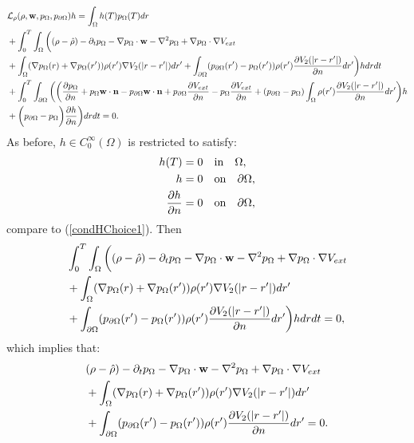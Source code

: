 \begin{align*}
&\mathcal{L}_\rho (\rho,\mathbf{w},p_\Omega,p_{\partial \Omega})h=
\int_\Omega h(T) p_\Omega(T) dr\\
&+ \int_0^T \int_\Omega \bigg( (\rho- \hat{\rho})   - \partial_t  p_\Omega  - \nabla p_\Omega \cdot \mathbf{w}  - \nabla^2 p_\Omega \notag 
+  \nabla p_\Omega\cdot \nabla V_{ext}  \notag \\
&+ \int_\Omega (\nabla  p_\Omega(r)+\nabla  p_\Omega(r')) \rho(r') \nabla V_2(|r-r'|) dr'+ \int_{\partial \Omega} ( p_{\partial \Omega}(r') - p_\Omega(r')) \rho(r')   \frac{\partial V_2(|r-r'|)}{\partial n} dr' \bigg) h dr dt \\
&+  \int_0^T\int_{\partial \Omega}  \bigg(
\bigg(\frac{\partial p_\Omega }{\partial n} + p_\Omega  \mathbf{w} \cdot \mathbf{n} - p_{\partial \Omega}\mathbf{w} \cdot \mathbf{n}  +  p_{\partial \Omega} \dfrac{\partial V_{ext}}{\partial n} - p_\Omega \frac{\partial V_{ext}}{\partial n} + ( p_{\partial \Omega} - p_\Omega)  \int_\Omega \rho(r') \frac{\partial V_2(|r-r'|)}{\partial n} dr'\bigg)h \notag\\
&+ \bigg( p_{\partial \Omega}- p_\Omega \bigg) \frac{\partial h}{\partial n} \bigg) dr dt =0.
\end{align*}
As before, $h \in C_0^\infty(\Omega)$ is restricted to satisfy:
\begin{align*}
h(T)&=0 \quad \text{in} \quad \Omega, \\
h&=0 \quad \text{on} \quad \partial \Omega, \notag \\
\frac{\partial h}{\partial n}&=0 \quad \text{on} \quad \partial \Omega, \notag
\end{align*}
compare to (\ref{condHChoice1}).
Then
\begin{align*}
&\int_0^T \int_\Omega \bigg( (\rho- \hat{\rho})   - \partial_t  p_\Omega  - \nabla p_\Omega \cdot \mathbf{w} - \nabla^2 p_\Omega \notag 
+  \nabla p_\Omega\cdot \nabla V_{ext}  \notag \\
&+ \int_\Omega (\nabla  p_\Omega(r)+\nabla  p_\Omega(r')) \rho(r') \nabla V_2(|r-r'|) dr'\\
&+ \int_{\partial \Omega} ( p_{\partial \Omega}(r') - p_\Omega(r')) \rho(r')   \frac{\partial V_2(|r-r'|)}{\partial n} dr' \bigg) h dr dt =0,
\end{align*}
which implies that:
\begin{align}\label{eqnAdjointNonlocal1}
& (\rho- \hat{\rho})   - \partial_t  p_\Omega  - \nabla p_\Omega \cdot \mathbf{w}  - \nabla^2 p_\Omega \notag 
+  \nabla p_\Omega\cdot \nabla V_{ext}  \notag \\
&+ \int_\Omega (\nabla  p_\Omega(r)+\nabla  p_\Omega(r')) \rho(r') \nabla V_2(|r-r'|) dr'\\
&+ \int_{\partial \Omega} ( p_{\partial \Omega}(r') - p_\Omega(r')) \rho(r')   \frac{\partial V_2(|r-r'|)}{\partial n} dr' =0 \notag.
\end{align}
